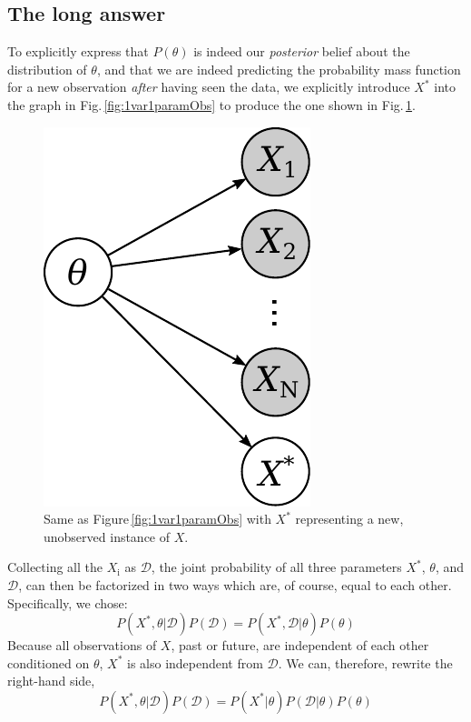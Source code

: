 \documentclass[]{report}
\begin{document}
\subsection{The long answer}
To explicitly express that $P(\theta)$ is indeed our \emph{posterior} belief about the distribution of $\theta$, and that we are indeed predicting the probability mass function for a new observation \emph{after} having seen the data, we explicitly introduce $X^*$ into the graph in Fig.\,\ref{fig:1var1paramObs} to produce the one shown in Fig.\,\ref{fig:1var1paramNewObs}.
\begin{figure}[h]
	\centering
	\includegraphics[scale=0.5]{1var_1param_new-obs}
	\caption{Same as Figure\,\ref{fig:1var1paramObs} with $X^*$ representing a new, unobserved instance of $X$.}
	\label{fig:1var1paramNewObs}
\end{figure}
Collecting all the $X_\mathrm{i}$ as $\mathcal{D}$, the joint probability of all three parameters $X^*$, $\theta$, and $\mathcal{D}$, can then be factorized in two ways which are, of course, equal to each other. Specifically, we chose:
\begin{equation}
P( X^*, \theta | \mathcal{D} )
P (\mathcal{D} )
=
P( X^*, \mathcal{D} | \theta )
P( \theta )
\end{equation}
Because all observations of $X$, past or future, are independent of each other conditioned on $\theta$, $X^*$ is also independent from $\mathcal{D}$. We can, therefore, rewrite the right-hand side,
\begin{equation}
P( X^*, \theta | \mathcal{D} )
P( \mathcal{D} )
= 
P( X^* | \theta )
P( \mathcal{D} | \theta )
P( \theta )
\end{equation}
\end{document}
